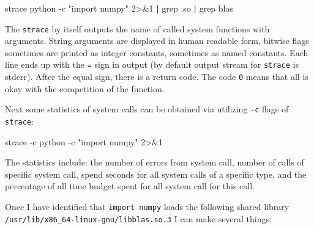 \documentclass[
]{article}
\newenvironment{Shaded}{}{}
\newcommand{\AttributeTok}[1]{\textcolor[rgb]{0.49,0.56,0.16}{#1}}
\newcommand{\DecValTok}[1]{\textcolor[rgb]{0.25,0.63,0.44}{#1}}
\newcommand{\ExtensionTok}[1]{#1}
\newcommand{\FunctionTok}[1]{\textcolor[rgb]{0.02,0.16,0.49}{#1}}
\newcommand{\KeywordTok}[1]{\textcolor[rgb]{0.00,0.44,0.13}{\textbf{#1}}}
\newcommand{\NormalTok}[1]{#1}
\newcommand{\OperatorTok}[1]{\textcolor[rgb]{0.40,0.40,0.40}{#1}}
\newcommand{\StringTok}[1]{\textcolor[rgb]{0.25,0.44,0.63}{#1}}
\begin{document}
\begin{Shaded}
\begin{Highlighting}[]
\ExtensionTok{strace}\NormalTok{ python }\AttributeTok{{-}c} \StringTok{"import numpy"} \DecValTok{2}\OperatorTok{\textgreater{}\&}\DecValTok{1} \KeywordTok{|} \FunctionTok{grep}\NormalTok{ .so }\KeywordTok{|} \FunctionTok{grep}\NormalTok{ blas}
\end{Highlighting}
\end{Shaded}

The \texttt{strace} by itself outputs the name of called system
functions with arguments. String arguments are displayed in human
readable form, bitwise flags sometimes are printed as integer constants,
sometimes as named constants. Each line ends up with the \texttt{=} sign
in output (by default output stream for \texttt{strace} is stderr).
After the equal sign, there is a return code. The code \texttt{0} means
that all is okay with the competition of the function.

Next some statistics of system calls can be obtained via utilizing
\texttt{-c} flags of \texttt{strace}:

\begin{Shaded}
\begin{Highlighting}[]
\ExtensionTok{strace} \AttributeTok{{-}c}\NormalTok{ python }\AttributeTok{{-}c} \StringTok{"import numpy"} \DecValTok{2}\OperatorTok{\textgreater{}\&}\DecValTok{1}
\end{Highlighting}
\end{Shaded}

The statistics include: the number of errors from system call, number of
calls of specific system call, spend seconds for all system calls of a
specific type, and the percentage of all time budget spent for all
system call for this call.

Once I have identified that \texttt{import\ numpy} loads the following
shared library \texttt{/usr/lib/x86\_64-linux-gnu/libblas.so.3} I can
make several things:
\end{document}
